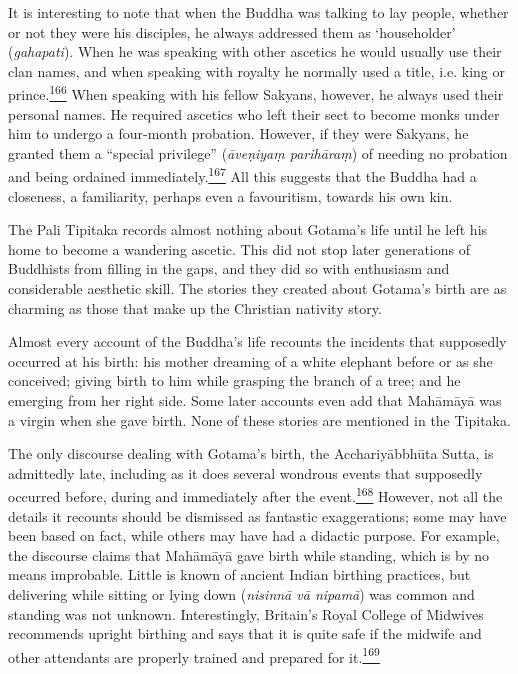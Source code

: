 It is interesting to note that when the Buddha was talking to lay
people, whether or not they were his disciples, he always addressed them
as `householder' (\emph{gahapati}). When he was speaking with other
ascetics he would usually use their clan names, and when speaking with
royalty he normally used a title, i.e. king or
prince.\label{footprints_split_008.html_fnref166}\hyperref[footprints_split_024.htmlux5cux23fn166]{\textsuperscript{166}}
When speaking with his fellow Sakyans, however, he always used their
personal names. He required ascetics who left their sect to become monks
under him to undergo a four-month probation. However, if they were
Sakyans, he granted them a ``special privilege'' (\emph{āveṇiyaṃ
parihāraṃ}) of needing no probation and being ordained
immediately.\label{footprints_split_008.html_fnref167}\hyperref[footprints_split_024.htmlux5cux23fn167]{\textsuperscript{167}}
All this suggests that the Buddha had a closeness, a familiarity,
perhaps even a favouritism, towards his own kin.

The Pali Tipitaka records almost nothing about Gotama's life until he
left his home to become a wandering ascetic. This did not stop later
generations of Buddhists from filling in the gaps, and they did so with
enthusiasm and considerable aesthetic skill. The stories they created
about Gotama's birth are as charming as those that make up the Christian
nativity story.

Almost every account of the Buddha's life recounts the incidents that
supposedly occurred at his birth: his mother dreaming of a white
elephant before or as she conceived; giving birth to him while grasping
the branch of a tree; and he emerging from her right side. Some later
accounts even add that Mahāmāyā was a virgin when she gave birth. None
of these stories are mentioned in the Tipitaka.

The only discourse dealing with Gotama's birth, the Acchariyābbhūta
Sutta, is admittedly late, including as it does several wondrous events
that supposedly occurred before, during and immediately after the
event.\label{footprints_split_008.html_fnref168}\hyperref[footprints_split_024.htmlux5cux23fn168]{\textsuperscript{168}}
However, not all the details it recounts should be dismissed as
fantastic exaggerations; some may have been based on fact, while others
may have had a didactic purpose. For example, the discourse claims that
Mahāmāyā gave birth while standing, which is by no means improbable.
Little is known of ancient Indian birthing practices, but delivering
while sitting or lying down (\emph{nisinnā vā nipamā}) was common and
standing was not unknown. Interestingly, Britain's Royal College of
Midwives recommends upright birthing and says that it is quite safe if
the midwife and other attendants are properly trained and prepared for
it.\label{footprints_split_008.html_fnref169}\hyperref[footprints_split_024.htmlux5cux23fn169]{\textsuperscript{169}}

